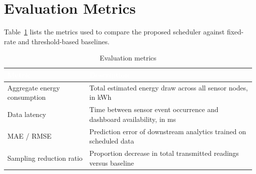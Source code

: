 \section{Evaluation Metrics}

Table~\ref{tab:metrics} lists the metrics used to compare the proposed scheduler against fixed-rate
and threshold-based baselines.

\begin{table}[htbp]
\centering
\caption{Evaluation metrics}
\label{tab:metrics}
\begin{tabularx}{\textwidth}{@{}p{3.2cm}X@{}}
\toprule
\rowcolor{ummaroon!85}
\textcolor{white}{\textbf{Metric}} & \textcolor{white}{\textbf{Description}} \\
\midrule
Aggregate energy consumption & Total estimated energy draw across all sensor nodes, in kWh \\
\addlinespace
Data latency & Time between sensor event occurrence and dashboard availability, in ms \\
\addlinespace
MAE / RMSE & Prediction error of downstream analytics trained on scheduled data \\
\addlinespace
Sampling reduction ratio & Proportion decrease in total transmitted readings versus baseline \\
\bottomrule
\end{tabularx}
\end{table}
